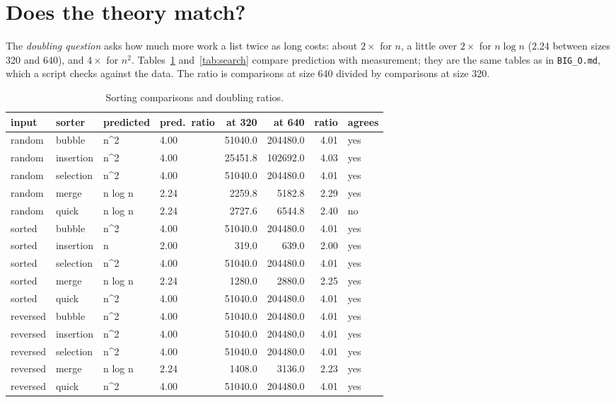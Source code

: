 \documentclass[11pt]{article}
\begin{document}
\section{Does the theory match?}
The \emph{doubling question} asks how much more work a list twice as long costs: about $2\times$ for $n$, a little over $2\times$ for $n \log n$ (2.24 between sizes 320 and 640), and $4\times$ for $n^2$. Tables~\ref{tab:sort} and~\ref{tab:search} compare prediction with measurement; they are the same tables as in \texttt{BIG\_O.md}, which a script checks against the data. The ratio is comparisons at size 640 divided by comparisons at size 320.

\begin{table}[ht]
\centering
\small
\begin{tabular}{llllrrrl}
\toprule
input & sorter & predicted & pred.\ ratio & at 320 & at 640 & ratio & agrees \\
\midrule
random & bubble & n\^{}2 & 4.00 & 51040.0 & 204480.0 & 4.01 & yes \\
random & insertion & n\^{}2 & 4.00 & 25451.8 & 102692.0 & 4.03 & yes \\
random & selection & n\^{}2 & 4.00 & 51040.0 & 204480.0 & 4.01 & yes \\
random & merge & n log n & 2.24 & 2259.8 & 5182.8 & 2.29 & yes \\
random & quick & n log n & 2.24 & 2727.6 & 6544.8 & 2.40 & no \\
sorted & bubble & n\^{}2 & 4.00 & 51040.0 & 204480.0 & 4.01 & yes \\
sorted & insertion & n & 2.00 & 319.0 & 639.0 & 2.00 & yes \\
sorted & selection & n\^{}2 & 4.00 & 51040.0 & 204480.0 & 4.01 & yes \\
sorted & merge & n log n & 2.24 & 1280.0 & 2880.0 & 2.25 & yes \\
sorted & quick & n\^{}2 & 4.00 & 51040.0 & 204480.0 & 4.01 & yes \\
reversed & bubble & n\^{}2 & 4.00 & 51040.0 & 204480.0 & 4.01 & yes \\
reversed & insertion & n\^{}2 & 4.00 & 51040.0 & 204480.0 & 4.01 & yes \\
reversed & selection & n\^{}2 & 4.00 & 51040.0 & 204480.0 & 4.01 & yes \\
reversed & merge & n log n & 2.24 & 1408.0 & 3136.0 & 2.23 & yes \\
reversed & quick & n\^{}2 & 4.00 & 51040.0 & 204480.0 & 4.01 & yes \\
\bottomrule
\end{tabular}
\caption{Sorting comparisons and doubling ratios.}
\label{tab:sort}
\end{table}
\end{document}

